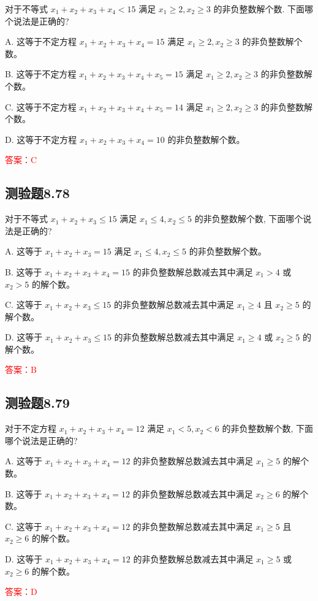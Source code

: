 \documentclass[UTF8, heading=true]{ctexart}
\begin{document}
对于不等式 $x_1+x_2+x_3+x_4<15$ 满足 $x_1 \geq 2, x_2 \geq 3$ 的非负整数解个数. 下面哪个说法是正确的?

A. 这等于不定方程 $x_1+x_2+x_3+x_4=15$ 满足 $x_1 \geq 2, x_2 \geq 3$ 的非负整数解个数。

B. 这等于不定方程 $x_1+x_2+x_3+x_4+x_5=15$ 满足 $x_1 \geq 2, x_2 \geq 3$ 的非负整数解个数。

C. 这等于不定方程 $x_1+x_2+x_3+x_4+x_5=14$ 满足 $x_1 \geq 2, x_2 \geq 3$ 的非负整数解个数。

D. 这等于不定方程 $x_1+x_2+x_3+x_4=10$ 的非负整数解个数。

\textcolor{red}{答案：C}

\subsection{测验题8.78}

对于不等式 $x_1+x_2+x_3 \leq 15$ 满足 $x_1 \leq 4, x_2 \leq 5$ 的非负整数解个数, 下面哪个说法是正确的?

A. 这等于 $x_1+x_2+x_3=15$ 满足 $x_1 \leq 4, x_2 \leq 5$ 的非负整数解个数。

B. 这等于 $x_1+x_2+x_3+x_4=15$ 的非负整数解总数减去其中满足 $x_1>4$ 或 $x_2>5$ 的解个数。

C. 这等于 $x_1+x_2+x_3 \leq 15$ 的非负整数解总数减去其中满足 $x_1 \geq 4$ 且 $x_2 \geq 5$ 的解个数。

D. 这等于 $x_1+x_2+x_3 \leq 15$ 的非负整数解总数减去其中满足 $x_1 \geq 4$ 或 $x_2 \geq 5$ 的解个数。

\textcolor{red}{答案：B}

\subsection{测验题8.79}

对于不定方程 $x_1+x_2+x_3+x_4=12$ 满足 $x_1<5, x_2<6$ 的非负整数解个数, 下面哪个说法是正确的?

A. 这等于 $x_1+x_2+x_3+x_4=12$ 的非负整数解总数減去其中满足 $x_1 \geq 5$ 的解个数。

B. 这等于 $x_1+x_2+x_3+x_4=12$ 的非负整数解总数减去其中满足 $x_2 \geq 6$ 的解个数。

C. 这等于 $x_1+x_2+x_3+x_4=12$ 的非负整数解总数减去其中满足 $x_1 \geq 5$ 且 $x_2 \geq 6$ 的解个数。

D. 这等于 $x_1+x_2+x_3+x_4=12$ 的非负整数解总数减去其中满足 $x_1 \geq 5$ 或 $x_2 \geq 6$ 的解个数。

\textcolor{red}{答案：D}
\end{document}
